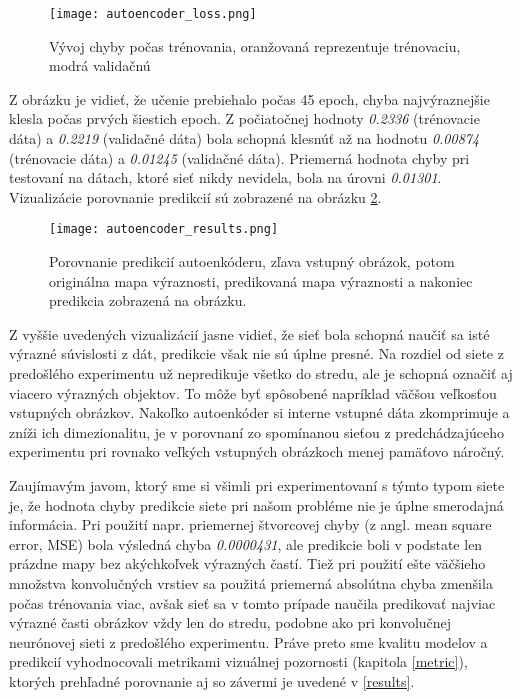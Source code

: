 \begin{figure}[H]
	\begin{center}\texttt{[image: autoencoder\_loss.png]}
		\caption[Vývoj chyby počas trénovania autoenkóderu]{
			Vývoj chyby počas trénovania, oranžovaná reprezentuje trénovaciu, modrá validačnú 
		}\label{autoencoder_loss}
	\end{center}
\end{figure}

Z obrázku je vidieť, že učenie prebiehalo počas 45 epoch, chyba najvýraznejšie klesla počas prvých šiestich epoch. Z počiatočnej hodnoty \textit{0.2336} (trénovacie dáta) a \textit{0.2219} (validačné dáta) bola schopná klesnúť až na hodnotu \textit{0.00874} (trénovacie dáta) a \textit{0.01245} (validačné dáta). Priemerná hodnota chyby pri testovaní na dátach, ktoré sieť nikdy nevidela, bola na úrovni \textit{0.01301}. Vizualizácie porovnanie predikcií sú zobrazené na obrázku \ref{autoencoder_results}.

\begin{figure}[H]
	\begin{center}\texttt{[image: autoencoder\_results.png]}
		\caption[Porovnanie predikcií autoenkóderu voči reálnym mapám výraznosti]{
			Porovnanie predikcií autoenkóderu, zľava vstupný obrázok, potom originálna mapa výraznosti, predikovaná mapa výraznosti a nakoniec predikcia zobrazená na obrázku. 
		}\label{autoencoder_results}
	\end{center}
\end{figure}

Z vyššie uvedených vizualizácií jasne vidieť, že sieť bola schopná naučiť sa isté výrazné súvislosti z dát, predikcie však nie sú úplne presné. Na rozdiel od siete z predošlého experimentu už nepredikuje všetko do stredu, ale je schopná označiť aj viacero výrazných objektov. To môže byť spôsobené napríklad väčšou veľkosťou vstupných obrázkov. Nakoľko autoenkóder si interne vstupné dáta zkomprimuje a zníži ich dimezionalitu, je v porovnaní zo spomínanou sieťou z predchádzajúceho experimentu pri rovnako veľkých vstupných obrázkoch menej pamäťovo náročný.

Zaujímavým javom, ktorý sme si všimli pri experimentovaní s týmto typom siete je, že hodnota chyby predikcie siete pri našom probléme nie je úplne smerodajná informácia. Pri použití napr. priemernej štvorcovej chyby (z angl. mean square error, MSE) bola výsledná chyba \textit{0.0000431}, ale predikcie boli v podstate len prázdne mapy bez akýchkoľvek výrazných častí. Tiež pri použití ešte väčšieho množstva konvolučných vrstiev sa použitá priemerná absolútna chyba zmenšila počas trénovania viac, avšak sieť sa v tomto prípade naučila predikovať najviac výrazné časti obrázkov vždy len do stredu, podobne ako pri konvolučnej neurónovej sieti z predošlého experimentu. Práve preto sme kvalitu modelov a predikcií vyhodnocovali metrikami vizuálnej pozornosti (kapitola \ref{metric}), ktorých prehľadné porovnanie aj so závermi je uvedené v \ref{results}.

